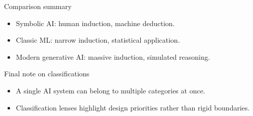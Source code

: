 \documentclass[12pt]{beamer}
\begin{document}

\begin{frame}{Comparison summary}
  \begin{itemize}
    \item Symbolic AI: human induction, machine deduction.
    \item Classic ML: narrow induction, statistical application.
    \item Modern generative AI: massive induction, simulated reasoning.
  \end{itemize}
\end{frame}

\begin{frame}{Final note on classifications}
  \begin{itemize}
    \item A single AI system can belong to multiple categories at once.
    \item Classification lenses highlight design priorities rather than rigid boundaries.
  \end{itemize}
\end{frame}
\end{document}
